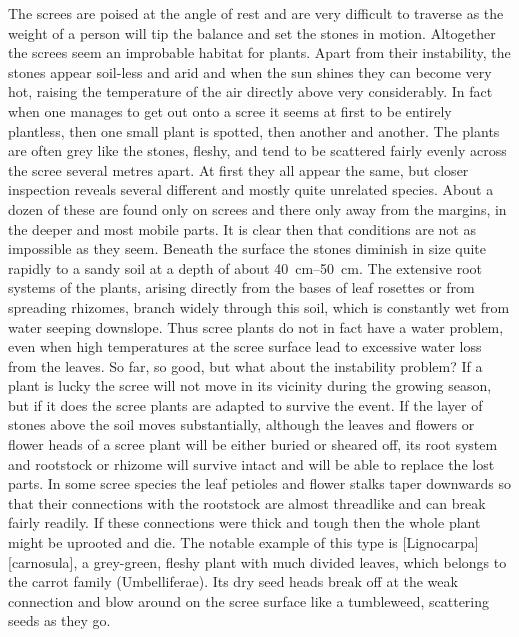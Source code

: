 The screes are poised at the angle of rest and are very difficult to traverse as the weight of a person will tip the balance and set the stones in motion.
Altogether the screes seem an improbable habitat for plants.
Apart from their instability, the stones appear soil-less and arid and when the sun shines they can become very hot, raising the temperature of the air directly above very considerably.
In fact when one manages to get out onto a scree it seems at first to be entirely plantless, then one small plant is spotted, then another and another.
The plants are often grey like the stones, fleshy, and tend to be scattered fairly evenly across the scree several metres apart.
At first they all appear the same, but closer inspection reveals several different and mostly quite unrelated species.
About a dozen of these are found only on screes and there only away from the margins, in the deeper and most mobile parts.
It is clear then that conditions are not as impossible as they seem.
Beneath the surface the stones diminish in size quite rapidly to a sandy soil at a depth of about \SIrange{40}{50}{\centi\metre}.
The extensive root systems of the plants, arising directly from the bases of leaf rosettes or from spreading rhizomes, branch widely through this soil, which is constantly wet from water seeping downslope.
Thus scree plants do not in fact have a water problem, even when high temperatures at the scree surface lead to excessive water loss from the leaves.
So far, so good, but what about the instability problem? If a plant is lucky the scree will not move in its vicinity during the growing season, but if it does the scree plants are adapted to survive the event.
If the layer of stones above the soil moves substantially, although the leaves and flowers or flower heads of a scree plant will be either buried or sheared off, its root system and rootstock or rhizome will survive intact and will be able to replace the lost parts.
In some scree species the leaf petioles and flower stalks taper downwards so that their connections with the rootstock are almost threadlike and can break fairly readily.
If these connections were thick and tough then the whole plant might be uprooted and die.
The notable example of this type is [Lignocarpa][carnosula], a grey-green, fleshy plant with much divided leaves, which belongs to the carrot family (Umbelliferae).
Its dry seed heads break off at the weak connection and blow around on the scree surface like a tumbleweed, scattering seeds as they go.


